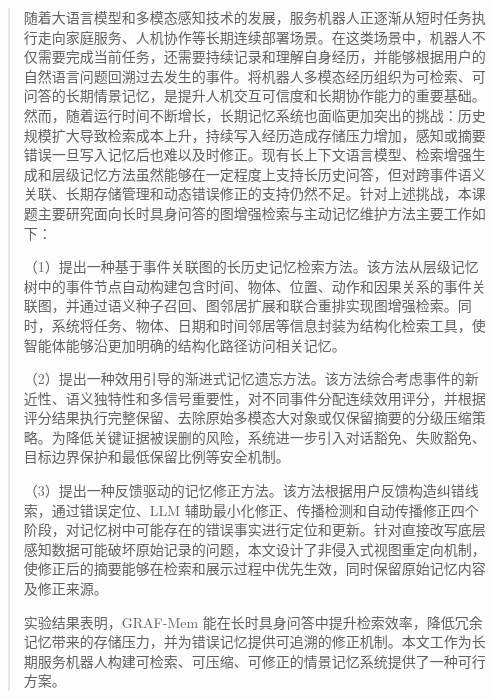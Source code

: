 
\begin{abstract}
随着大语言模型和多模态感知技术的发展，服务机器人正逐渐从短时任务执行走向家庭服务、人机协作等长期连续部署场景。在这类场景中，机器人不仅需要完成当前任务，还需要持续记录和理解自身经历，并能够根据用户的自然语言问题回溯过去发生的事件。将机器人多模态经历组织为可检索、可问答的长期情景记忆，是提升人机交互可信度和长期协作能力的重要基础。然而，随着运行时间不断增长，长期记忆系统也面临更加突出的挑战：历史规模扩大导致检索成本上升，持续写入经历造成存储压力增加，感知或摘要错误一旦写入记忆后也难以及时修正。现有长上下文语言模型、检索增强生成和层级记忆方法虽然能够在一定程度上支持长历史问答，但对跨事件语义关联、长期存储管理和动态错误修正的支持仍然不足。针对上述挑战，本课题主要研究面向长时具身问答的图增强检索与主动记忆维护方法主要工作如下：

（1）提出一种基于事件关联图的长历史记忆检索方法。该方法从层级记忆树中的事件节点自动构建包含时间、物体、位置、动作和因果关系的事件关联图，并通过语义种子召回、图邻居扩展和联合重排实现图增强检索。同时，系统将任务、物体、日期和时间邻居等信息封装为结构化检索工具，使智能体能够沿更加明确的结构化路径访问相关记忆。

（2）提出一种效用引导的渐进式记忆遗忘方法。该方法综合考虑事件的新近性、语义独特性和多信号重要性，对不同事件分配连续效用评分，并根据评分结果执行完整保留、去除原始多模态大对象或仅保留摘要的分级压缩策略。为降低关键证据被误删的风险，系统进一步引入对话豁免、失败豁免、目标边界保护和最低保留比例等安全机制。

（3）提出一种反馈驱动的记忆修正方法。该方法根据用户反馈构造纠错线索，通过错误定位、LLM 辅助最小化修正、传播检测和自动传播修正四个阶段，对记忆树中可能存在的错误事实进行定位和更新。针对直接改写底层感知数据可能破坏原始记录的问题，本文设计了非侵入式视图重定向机制，使修正后的摘要能够在检索和展示过程中优先生效，同时保留原始记忆内容及修正来源。

实验结果表明，GRAF-Mem 能在长时具身问答中提升检索效率，降低冗余记忆带来的存储压力，并为错误记忆提供可追溯的修正机制。本文工作为长期服务机器人构建可检索、可压缩、可修正的情景记忆系统提供了一种可行方案。
\let\cleardoublepage\relax
\end{abstract}

